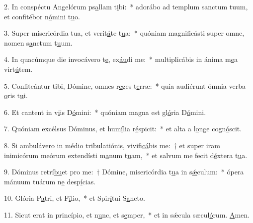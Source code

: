 2. In conspéctu Angelórum ps\uline{a}llam t\uline{i}bi:~* adorábo ad templum sanctum tuum, et confitébor n\uline{ó}mini t\uline{u}o.\par 
3. Super misericórdia tua, et verit\uline{á}te t\uline{u}a:~* quóniam magnificásti super omne, nomen s\uline{a}nctum t\uline{u}um.\par 
4. In quacúmque die invocávero t\uline{e}, ex\uline{áu}di me:~* multiplicábis in ánima m\uline{e}a virt\uline{ú}tem.\par 
5. Confiteántur tibi, Dómine, omnes r\uline{e}ges t\uline{e}rræ:~* quia audiérunt ómnia verba \uline{o}ris t\uline{u}i.\par 
6. Et cantent in v\uline{i}is D\uline{ó}mini:~* quóniam magna est gl\uline{ó}ria D\uline{ó}mini.\par 
7. Quóniam excélsus Dóminus, et hum\uline{í}lia r\uline{é}spicit:~* et alta a l\uline{o}nge cogn\uline{ó}scit.\par 
8. Si ambulávero in médio tribulatiónis, vivifi\uline{cá}bis me:~† et super iram inimicórum meórum extendísti m\uline{a}num t\uline{u}am,~* et salvum me fecit d\uline{é}xtera t\uline{u}a.\par 
9. Dóminus retrí\uline{bu}et pro me:~† Dómine, misericórdia t\uline{u}a in s\uline{ǽ}culum:~* ópera mánuum tuárum n\uline{e} desp\uline{í}cias.\par 
10. Glória P\uline{a}tri, et F\uline{í}lio,~* et Spir\uline{í}tui S\uline{a}ncto.\par 
11. Sicut erat in princípio, et n\uline{u}nc, et s\uline{e}mper,~* et in sǽcula sæcul\uline{ó}rum. \uline{A}men.\par 
